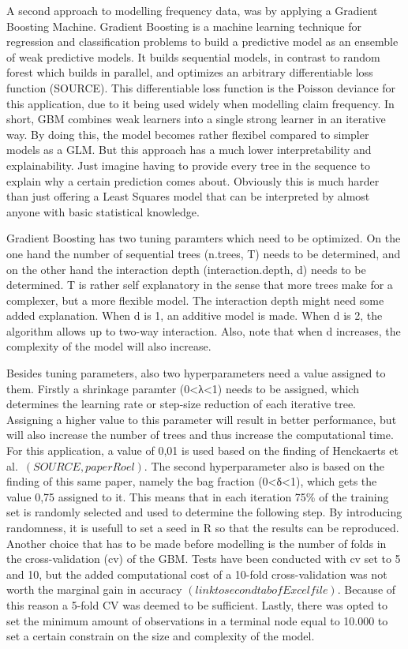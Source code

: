 \documentclass[
  12pt,
]{article}
\begin{document}
A second approach to modelling frequency data, was by applying a
Gradient Boosting Machine. Gradient Boosting is a machine learning
technique for regression and classification problems to build a
predictive model as an ensemble of weak predictive models. It builds
sequential models, in contrast to random forest which builds in
parallel, and optimizes an arbitrary differentiable loss function
(SOURCE). This differentiable loss function is the Poisson deviance for
this application, due to it being used widely when modelling claim
frequency. In short, GBM combines weak learners into a single strong
learner in an iterative way. By doing this, the model becomes rather
flexibel compared to simpler models as a GLM. But this approach has a
much lower interpretability and explainability. Just imagine having to
provide every tree in the sequence to explain why a certain prediction
comes about. Obviously this is much harder than just offering a Least
Squares model that can be interpreted by almost anyone with basic
statistical knowledge.

Gradient Boosting has two tuning paramters which need to be optimized.
On the one hand the number of sequential trees (n.trees, T) needs to be
determined, and on the other hand the interaction depth
(interaction.depth, d) needs to be determined. T is rather self
explanatory in the sense that more trees make for a complexer, but a
more flexible model. The interaction depth might need some added
explanation. When d is 1, an additive model is made. When d is 2, the
algorithm allows up to two-way interaction. Also, note that when d
increases, the complexity of the model will also increase.

Besides tuning parameters, also two hyperparameters need a value
assigned to them. Firstly a shrinkage paramter (0\textless λ\textless1)
needs to be assigned, which determines the learning rate or step-size
reduction of each iterative tree. Assigning a higher value to this
parameter will result in better performance, but will also increase the
number of trees and thus increase the computational time. For this
application, a value of 0,01 is used based on the finding of Henckaerts
et al.~\((SOURCE, paper Roel)\). The second hyperparameter also is based
on the finding of this same paper, namely the bag fraction
(0\textless δ\textless1), which gets the value 0,75 assigned to it. This
means that in each iteration 75\% of the training set is randomly
selected and used to determine the following step. By introducing
randomness, it is usefull to set a seed in R so that the results can be
reproduced. Another choice that has to be made before modelling is the
number of folds in the cross-validation (cv) of the GBM. Tests have been
conducted with cv set to 5 and 10, but the added computational cost of a
10-fold cross-validation was not worth the marginal gain in accuracy
\((link to second tab of Excel file)\). Because of this reason a 5-fold
CV was deemed to be sufficient. Lastly, there was opted to set the
minimum amount of observations in a terminal node equal to 10.000 to set
a certain constrain on the size and complexity of the model.
\end{document}
